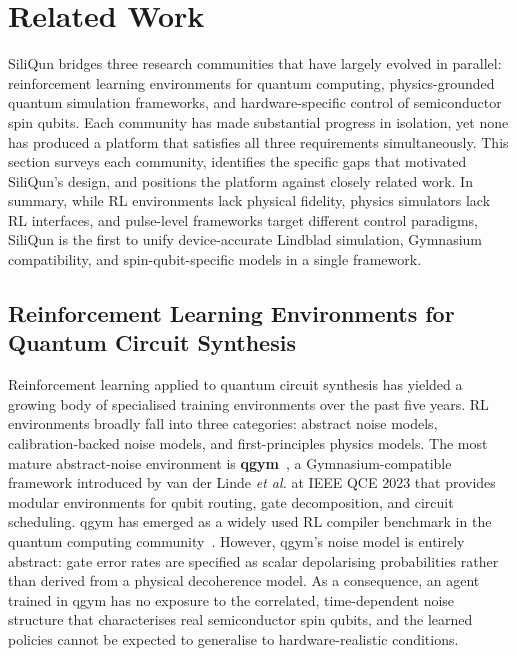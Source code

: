 
\section{Related Work}
\label{sec:related_work}

SiliQun bridges three research communities that have largely evolved in parallel: reinforcement learning environments for quantum computing, physics-grounded quantum simulation frameworks, and hardware-specific control of semiconductor spin qubits. Each community has made substantial progress in isolation, yet none has produced a platform that satisfies all three requirements simultaneously. This section surveys each community, identifies the specific gaps that motivated SiliQun's design, and positions the platform against closely related work. In summary, while RL environments lack physical fidelity, physics simulators lack RL interfaces, and pulse-level frameworks target different control paradigms, SiliQun is the first to unify device-accurate Lindblad simulation, Gymnasium compatibility, and spin-qubit-specific models in a single framework.

\subsection{Reinforcement Learning Environments for Quantum Circuit Synthesis}
\label{sec:rw_rl_envs}

Reinforcement learning applied to quantum circuit synthesis has yielded a
growing body of specialised training environments over the past five years. RL environments broadly fall into three categories: abstract noise models, calibration-backed noise models, and first-principles physics models. The most mature abstract-noise environment is \textbf{qgym}~\cite{vanderLinde2023qgym},
a Gymnasium-compatible framework introduced by van der Linde \emph{et al.}
at IEEE QCE 2023 that provides modular environments for qubit routing, gate
decomposition, and circuit scheduling. qgym has emerged as a widely used RL compiler benchmark in the quantum computing community~\cite{vanderLinde2023qgym}. However, qgym's noise model is
entirely abstract: gate error rates are specified as scalar depolarising
probabilities rather than derived from a physical decoherence model. As a
consequence, an agent trained in qgym has no exposure to the correlated,
time-dependent noise structure that characterises real semiconductor spin
qubits, and the learned policies cannot be expected to generalise to
hardware-realistic conditions.

